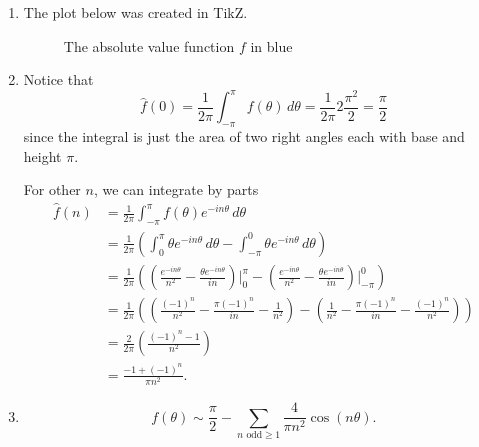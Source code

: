 \documentclass[12 pt, letterpaper]{hmcpset}
\begin{document}
\begin{solution}
	\begin{enumerate}
		\item The plot below was created in TikZ.
			\begin{figure}[H]
				\centering
				\caption{The absolute value function $f$ in blue}
			\end{figure}

		\item Notice that
			\[
				\hat{f}(0) = \frac{1}{2 \pi} \int_{-\pi}^{\pi} f(\theta) \, d \theta = \frac{1}{2 \pi} 2 \frac{\pi^{2}}{2} = \frac{\pi}{2}
			\]
			since the integral is just the area of two right angles each with base and height $\pi$.

			For other $n$, we can integrate by parts
			\begin{align*}
				\hat{f}(n) & = \frac{1}{2 \pi} \int_{-\pi}^{\pi} f(\theta) e^{-i n \theta} \, d\theta \\
					   & = \frac{1}{2 \pi} \left ( \int_{0}^{\pi} \theta e^{-i n \theta} \, d\theta - \int_{-\pi}^{0} \theta e^{-i n \theta} \, d\theta \right ) \\
					   & = \frac{1}{2 \pi} \left ( \left ( \frac{e^{-i n \theta}}{n^{2}} - \frac{\theta e^{-i n \theta}}{i n} \right ) \Big |_{0}^{\pi} - \left ( \frac{e^{-i n \theta}}{n^{2}} - \frac{\theta e^{-i n \theta}}{i n} \right ) \Big |_{-\pi}^{0} \right ) \\
					   & = \frac{1}{2 \pi} \left ( \left ( \frac{(-1)^{n}}{n^{2}} - \frac{\pi (-1)^{n}}{in} - \frac{1}{n^{2}} \right ) - \left ( \frac{1}{n^{2}} - \frac{\pi (-1)^{n}}{in} - \frac{(-1)^{n}}{n^{2}} \right ) \right ) \\
					   & = \frac{2}{2 \pi} \left ( \frac{(-1)^{n} - 1}{n^{2}}  \right ) \\
					   & = \frac{-1 + (-1)^{n}}{\pi n^{2}}.
			\end{align*}

		\item
			\[
				\boxed{
					f(\theta) \sim \frac{\pi}{2} - \sum_{n \text{ odd} \ge 1} \frac{4}{\pi n^{2}} \cos{(n \theta)}.
				}
			\]


\end{enumerate}
\end{solution}
\end{document}
